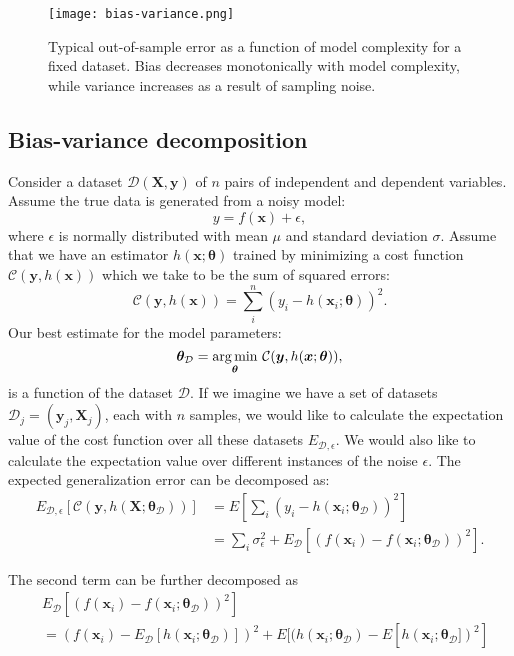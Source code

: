 \begin{figure}[h]
    \centering
    \texttt{[image: bias-variance.png]}
    \caption{Typical out-of-sample error as a function
    of model complexity for a fixed dataset. Bias decreases monotonically with
    model complexity, while variance increases as a result of
    sampling noise.}
    \label{fig:bias-variance}
\end{figure}

\subsection{Bias-variance decomposition}
Consider a dataset $\mathcal{D}(\bm{X}, \bm{y})$ of $n$ pairs
of independent and dependent variables. Assume the true data
is generated from a noisy model:
$$ y = f(\bm{x}) + \epsilon ,$$
where $\epsilon$ is normally distributed with mean $\mu$ and
standard deviation $\sigma$. Assume that we have an estimator $h(\bm{x}; \bm{\theta})$
trained by minimizing a cost function $\mathcal{C}(\bm{y}, h(\bm{x}))$
which we take to be the sum of squared errors:
$$ \mathcal{C}(\bm{y}, h(\bm{x})) = \sum_i^n (y_i - h(\bm{x}_i; \bm{\theta}))^2 .$$
Our best estimate for the model parameters:
$$ \bm{\theta}_{\mathcal{D}} = \underset{\bm{\theta}}{\operatorname*{arg\,min}} \
\mathcal{C}(\bm{y}, h(\bm{x}; \bm{\theta})) ,$$
is a function of the dataset $\mathcal{D}$. If we imagine we have a set of
datasets $\mathcal{D}_j = (\bm{y}_j, \bm{X}_j)$, each with $n$ samples, we would like to calculate
the expectation value of the cost function over all these datasets $E_{\mathcal{D}, \epsilon}$.
We would also like to calculate the expectation value over different instances of the noise $\epsilon$.
The expected generalization error can be decomposed as:
\begin{equation}
\begin{split}
    E_{\mathcal{D}, \epsilon} [\mathcal{C}(\bm{y}, h(\bm{X} ; \bm{\theta}_{\mathcal{D}}))]
    &= E \left[ \sum_i (y_i - h(\bm{x}_i ; \bm{\theta}_{\mathcal{D}}))^2 \right] \\
    &= \sum_i \sigma_{\epsilon}^2 + E_{\mathcal{D}}[(f(\bm{x}_i) - f(\bm{x}_i ; \bm{\theta}_{\mathcal{D}}))^2] .
\end{split}
\end{equation}

The second term can be further decomposed as
\begin{equation}
\begin{split}
    &E_{\mathcal{D}}[(f(\bm{x}_i) - f(\bm{x}_i ; \bm{\theta}_{\mathcal{D}}))^2] \\
    &= (f(\bm{x}_i) - E_{\mathcal{D}}[h(\bm{x}_i ; \bm{\theta}_{\mathcal{D}})])^2
    + E[(h(\bm{x}_i ; \bm{\theta}_{\mathcal{D}}) - E[h(\bm{x}_i ; \bm{\theta}_{\mathcal{D}}])^2]
\end{split}
\end{equation}

